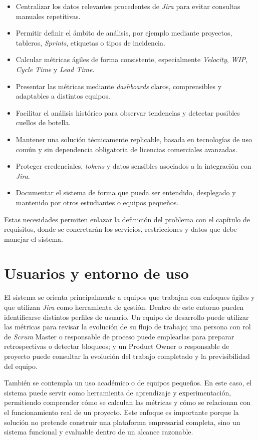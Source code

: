 \begin{itemize}
    \item Centralizar los datos relevantes procedentes de \textit{Jira} para evitar consultas manuales repetitivas.
    \item Permitir definir el ámbito de análisis, por ejemplo mediante proyectos, tableros, \textit{Sprints}, etiquetas o tipos de incidencia.
    \item Calcular métricas ágiles de forma consistente, especialmente \textit{Velocity}, \textit{WIP}, \textit{Cycle Time} y \textit{Lead Time}.
    \item Presentar las métricas mediante \textit{dashboards} claros, comprensibles y adaptables a distintos equipos.
    \item Facilitar el análisis histórico para observar tendencias y detectar posibles cuellos de botella.
    \item Mantener una solución técnicamente replicable, basada en tecnologías de uso común y sin dependencia obligatoria de licencias comerciales avanzadas.
    \item Proteger credenciales, \textit{tokens} y datos sensibles asociados a la integración con \textit{Jira}.
    \item Documentar el sistema de forma que pueda ser entendido, desplegado y mantenido por otros estudiantes o equipos pequeños.
\end{itemize}

Estas necesidades permiten enlazar la definición del problema con el capítulo de requisitos, donde se concretarán los servicios, restricciones y datos que debe manejar el sistema.

\section{Usuarios y entorno de uso}

El sistema se orienta principalmente a equipos que trabajan con enfoques ágiles y que utilizan \textit{Jira} como herramienta de gestión. Dentro de este entorno pueden identificarse distintos perfiles de usuario. Un equipo de desarrollo puede utilizar las métricas para revisar la evolución de su flujo de trabajo; una persona con rol de \textit{Scrum} Master o responsable de proceso puede emplearlas para preparar retrospectivas o detectar bloqueos; y un Product Owner o responsable de proyecto puede consultar la evolución del trabajo completado y la previsibilidad del equipo.

También se contempla un uso académico o de equipos pequeños. En este caso, el sistema puede servir como herramienta de aprendizaje y experimentación, permitiendo comprender cómo se calculan las métricas y cómo se relacionan con el funcionamiento real de un proyecto. Este enfoque es importante porque la solución no pretende construir una plataforma empresarial completa, sino un sistema funcional y evaluable dentro de un alcance razonable.

